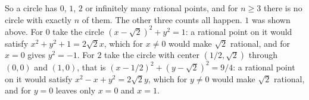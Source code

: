 So a circle has $0$, $1$, $2$ or infinitely many rational points, and for $n\ge3$ there is no circle with
exactly $n$ of them. The other three counts all happen. $1$ was shown above. For $0$ take the circle
$(x-\sqrt{2})^2+y^2=1$: a rational point on it would satisfy $x^2+y^2+1=2\sqrt{2}x$, which for $x\ne0$
would make $\sqrt{2}$ rational, and for $x=0$ gives $y^2=-1$. For $2$ take the circle with center
$(1/2,\sqrt{2})$ through $(0,0)$ and $(1,0)$, that is $(x-1/2)^2+(y-\sqrt{2})^2=9/4$: a rational point on
it would satisfy $x^2-x+y^2=2\sqrt{2}y$, which for $y\ne0$ would make $\sqrt{2}$ rational, and for $y=0$
leaves only $x=0$ and $x=1$.
